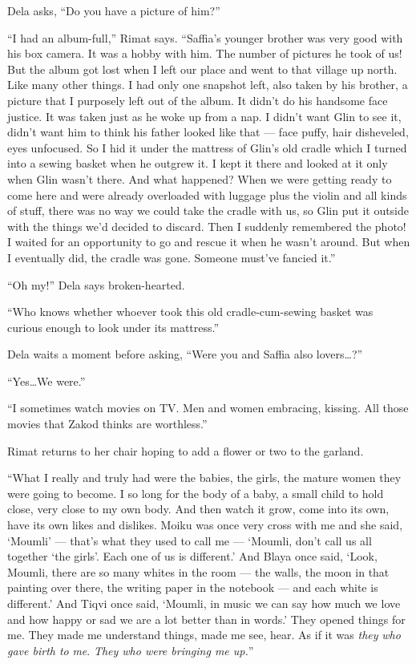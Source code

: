 \documentclass[twoside,11pt,openany]{book}
\begin{document}
Dela asks, ``Do you have a picture of him?''

``I had an album-full,'' Rimat says. ``Saffia's younger brother was very good
with his box camera. It was a hobby with him.  The number of pictures he took of us! But the album got lost when I left
our place and went to that village up north. Like many other things. I had only one snapshot left, also taken by his
brother, a picture that I purposely left out of the album. It didn't do his handsome face justice. It was taken just as
he woke up from a nap. I didn't want Glin to see it, didn't want him to think his father looked like that --- face
puffy, hair disheveled, eyes unfocused. So I hid it under the mattress of Glin's old cradle which I turned into a
sewing basket when he outgrew it. I kept it there and looked at it only when Glin wasn't there. And what happened? When
we were getting ready to come here and were already overloaded with luggage plus the violin and all kinds of stuff,
there was no way we could take the cradle with us, so Glin put it outside with the things we'd decided to discard. Then
I suddenly remembered the photo! I waited for an opportunity to go and rescue it when he wasn't around. But when I
eventually did, the cradle was gone. Someone must've fancied it.''

``Oh my!''  Dela says broken-hearted.

``Who knows whether whoever took this old cradle-cum-sewing basket was curious enough to look under its
mattress.''

Dela waits a moment before asking,
``Were you and Saffia also \linebreak[4]lovers{\ldots}?''

``Yes{\ldots}We were.''

``I sometimes watch movies on TV. Men and women embracing, kissing. All those movies that Zakod thinks are
worthless.''

Rimat returns to her chair hoping to add a flower or two to the garland.

``What I really and truly had were the babies, the girls, the mature women they were going to become. I so
long for the body of a baby, a small child to hold close, very close to my own body. And then watch it grow, come into
its own, have its own likes and dislikes. Moiku was once very cross with me and she said, `Moumli' --- that's what
they used to call me --- `Moumli, don't call us all together `the girls'. Each one of us is different.'   And Blaya
once said, `Look, Moumli, there are so many whites in the room --- the walls, the moon in that painting over there, the
writing paper in the notebook --- and each white is different.' And Tiqvi once said, `Moumli, in music we can say how
much we love and how happy or sad we are a lot better than in words.' They opened things for me. They made me
understand things, made me see, hear. As if it was \textit{they} \textit{who gave birth to} \textit{me}.\textit{ They
who were bringing me up.}''
\end{document}
